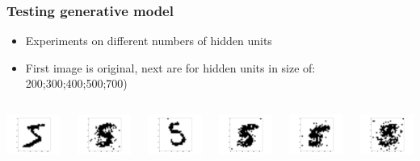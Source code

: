\documentclass{beamer}
\begin{document}
  \begin{frame}[plain]
    \frametitle{Testing generative model}
    \begin{itemize}
	\item Experiments on different numbers of hidden units
	\item First image is original, next are for hidden units in size of: 200;300;400;500;700)
	\end{itemize}
	\begin{columns}
		\begin{column}{0.15\textwidth}
            \includegraphics[width=2cm]{images/5original.png}
		\end{column}
		\begin{column}{0.15\textwidth}
			\includegraphics[width=2cm]{images/hidden200.png}
		\end{column}
		\begin{column}{0.15\textwidth}
			\includegraphics[width=2cm]{images/hidden300.png}
		\end{column}
		\begin{column}{0.15\textwidth}
			\includegraphics[width=2cm]{images/hidden400.png}
		\end{column}
		\begin{column}{0.15\textwidth}
			\includegraphics[width=2cm]{images/hidden500.png}
		\end{column}
		\begin{column}{0.15\textwidth}
			\includegraphics[width=2cm]{images/hidden700.png}

\end{column}
\end{columns}
\end{frame}
\end{document}
